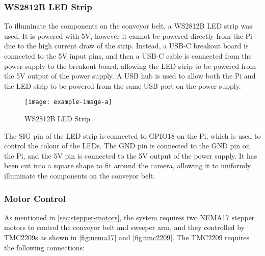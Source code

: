 \subsubsection{WS2812B LED Strip}
To illuminate the components on the conveyor belt, a WS2812B LED strip was used. It is powered with 5V, however it cannot be powered directly from the Pi due to the high current draw of the strip. Instead, a USB-C breakout board is connected to the 5V input pins, and then a USB-C cable is connected from the power supply to the breakout board, allowing the LED strip to be powered from the 5V output of the power supply. A USB hub is used to allow both the Pi and the LED strip to be powered from the same USB port on the power supply.

\begin{figure}[H]
  \hfill
  \begin{minipage}[t]{\textwidth}
    \centering
    \texttt{[image: example-image-a]}
    \caption{WS2812B LED Strip}
  \end{minipage}
\end{figure}

The SIG pin of the LED strip is connected to GPIO18 on the Pi, which is used to control the colour of the LEDs. The GND pin is connected to the GND pin on the Pi, and the 5V pin is connected to the 5V output of the power supply. It has been cut into a square shape to fit around the camera, allowing it to uniformly illuminate the components on the conveyor belt.

\subsubsection{Motor Control}
As mentioned in \autoref{sec:stepper-motors}, the system requires two NEMA17 stepper motors 
to control the conveyor belt and sweeper arm, and they controlled by TMC2209s as shown in \autoref{fig:nema17} and \autoref{fig:tmc2209}. The TMC2209 requires the following connections:

